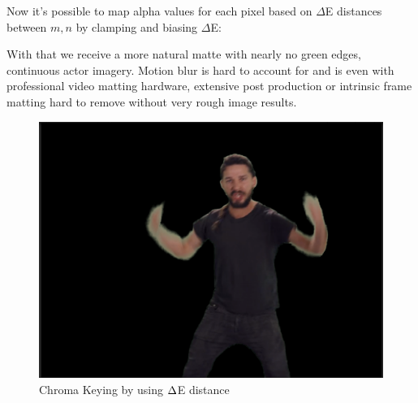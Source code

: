 Now it's possible to map alpha values for each pixel based on $\Delta$E 
distances between $m, n$ by clamping and biasing $\Delta$E:




With that we receive a more natural matte with nearly no green edges, 
continuous actor imagery. Motion blur is hard to account for and is even with 
professional video matting hardware, extensive post production or intrinsic 
frame matting hard to remove without very rough image results.

\begin{figure}[htb]
	\includegraphics[width=\textwidth]{_raw_resources/Comparison_DeltaE_color.png}
	\caption{Chroma Keying by using $\protect\Delta $E distance}
	\label{fig:chroma:deltae}
\end{figure}

